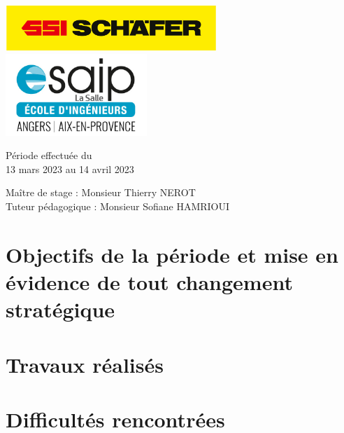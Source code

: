 \documentclass[a4paper, 12pt, french]{article}
\begin{document}
\begin{titlepage}
\begin{center}
			\vfill

			\includegraphics[width=0.6\textwidth]{../images/schaefer.jpg}
			\vfill
			\includegraphics[width=0.4\textwidth]{../images/esaip.jpg}

			\vfill

			Période effectuée du\\
			13 mars 2023 au 14 avril 2023

			\vspace{0.8cm}
			
			\Large
			Maître de stage : Monsieur Thierry NEROT\\
			Tuteur pédagogique : Monsieur Sofiane HAMRIOUI\\
		\end{center}
	\end{titlepage}
		
	\newpage
	
	\doublespacing
	\tableofcontents

	\newpage
		
	
	\listoffigures
	
	\newpage
	
	\singlespacing

	\section{Objectifs de la période et mise en évidence de tout changement stratégique}
	
	\newpage

	\section{Travaux réalisés}

	\newpage

	\section{Difficultés rencontrées}
	
\end{document}
